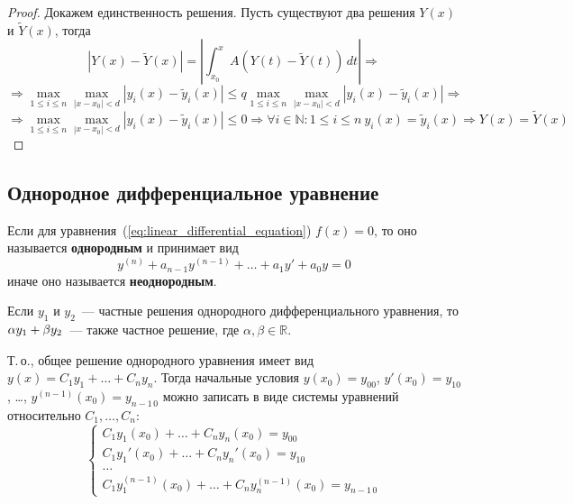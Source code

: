 \begin{proof}
Докажем единственность решения.
Пусть существуют два решения $Y(x)$ и $\tilde Y(x)$, тогда
\begin{equation*}
|Y(x) - \tilde Y(x)| = \left|\int_{x_0}^x A(Y(t) - \tilde Y(t))\,dt\right| \Rightarrow
\end{equation*}
\begin{equation*}
\Rightarrow \max_{1 \leqslant i \leqslant n} \max_{|x - x_0| < d} |y_i(x) - \tilde y_i(x)| \leqslant
q \max_{1 \leqslant i \leqslant n} \max_{|x - x_0| < d} |y_i(x) - \tilde y_i(x)| \Rightarrow
\end{equation*}
\begin{equation*}
\Rightarrow \max_{1 \leqslant i \leqslant n} \max_{|x - x_0| < d} |y_i(x) - \tilde y_i(x)| \leqslant 0 \Rightarrow
\forall i \in \mathbb N \colon 1 \leqslant i \leqslant n \ y_i(x) = \tilde y_i(x) \Rightarrow
Y(x) = \tilde Y(x)
\end{equation*}
\end{proof}

\subsection{Однородное дифференциальное уравнение}
 Если для уравнения~(\ref{eq:linear_differential_equation}) $f(x) = 0$, то оно называется \textbf{однородным} и принимает вид
\begin{equation}
\label{eq:homogeneous_differential_equation}
y^{(n)} + a_{n-1} y^{(n-1)} + \ldots + a_1 y' + a_0 y = 0
\end{equation}
иначе оно называется \textbf{неоднородным}.

\begin{statement}
Если $y_1$ и $y_2$~--- частные решения однородного дифференциального уравнения, то $\alpha y_1 \opbr+ \beta y_2$~--- также частное решение, где $\alpha, \beta \in \mathbb R$.
\end{statement}

Т.\,о., общее решение однородного уравнения имеет вид $y(x) = C_1 y_1 + \ldots + C_n y_n$.
Тогда начальные условия $y(x_0) = y_{00}$, $y'(x_0) = y_{10}$, \ldots, $y^{(n-1)}(x_0) = y_{n-1\,0}$ можно записать в виде системы уравнений относительно $C_1, \ldots, C_n$:
\begin{equation*}
\begin{cases}
C_1 y_1(x_0) + \ldots + C_n y_n(x_0) = y_{00} \\
C_1 y_1'(x_0) + \ldots + C_n y_n'(x_0) = y_{10} \\
\ldots \\
C_1 y_1^{(n-1)}(x_0) + \ldots + C_n y_n^{(n-1)}(x_0) = y_{n-1\,0}
\end{cases}
\end{equation*}

